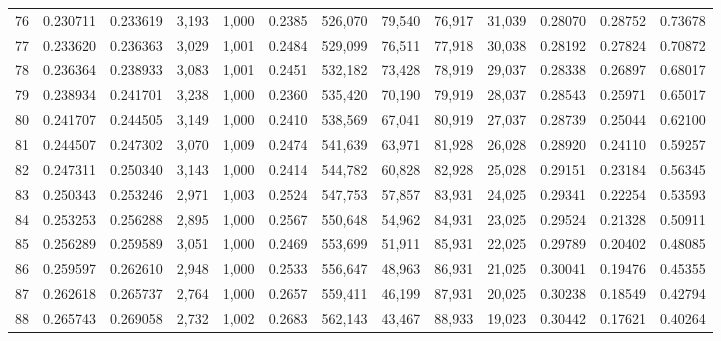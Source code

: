 \begin{tabular}{rrrrrrrrrrrrr}
76  &  0.230711 &  0.233619 &   3,193 &  1,000 &                                     0.2385 &  526,070 &   79,540 &   76,917 &   31,039 &  0.28070 &  0.28752 &  0.73678 \\
77  &  0.233620 &  0.236363 &   3,029 &  1,001 &                                     0.2484 &  529,099 &   76,511 &   77,918 &   30,038 &  0.28192 &  0.27824 &  0.70872 \\
78  &  0.236364 &  0.238933 &   3,083 &  1,001 &                                     0.2451 &  532,182 &   73,428 &   78,919 &   29,037 &  0.28338 &  0.26897 &  0.68017 \\
79  &  0.238934 &  0.241701 &   3,238 &  1,000 &                                     0.2360 &  535,420 &   70,190 &   79,919 &   28,037 &  0.28543 &  0.25971 &  0.65017 \\
80  &  0.241707 &  0.244505 &   3,149 &  1,000 &                                     0.2410 &  538,569 &   67,041 &   80,919 &   27,037 &  0.28739 &  0.25044 &  0.62100 \\
81  &  0.244507 &  0.247302 &   3,070 &  1,009 &                                     0.2474 &  541,639 &   63,971 &   81,928 &   26,028 &  0.28920 &  0.24110 &  0.59257 \\
82  &  0.247311 &  0.250340 &   3,143 &  1,000 &                                     0.2414 &  544,782 &   60,828 &   82,928 &   25,028 &  0.29151 &  0.23184 &  0.56345 \\
83  &  0.250343 &  0.253246 &   2,971 &  1,003 &                                     0.2524 &  547,753 &   57,857 &   83,931 &   24,025 &  0.29341 &  0.22254 &  0.53593 \\
84  &  0.253253 &  0.256288 &   2,895 &  1,000 &                                     0.2567 &  550,648 &   54,962 &   84,931 &   23,025 &  0.29524 &  0.21328 &  0.50911 \\
85  &  0.256289 &  0.259589 &   3,051 &  1,000 &                                     0.2469 &  553,699 &   51,911 &   85,931 &   22,025 &  0.29789 &  0.20402 &  0.48085 \\
86  &  0.259597 &  0.262610 &   2,948 &  1,000 &                                     0.2533 &  556,647 &   48,963 &   86,931 &   21,025 &  0.30041 &  0.19476 &  0.45355 \\
87  &  0.262618 &  0.265737 &   2,764 &  1,000 &                                     0.2657 &  559,411 &   46,199 &   87,931 &   20,025 &  0.30238 &  0.18549 &  0.42794 \\
88  &  0.265743 &  0.269058 &   2,732 &  1,002 &                                     0.2683 &  562,143 &   43,467 &   88,933 &   19,023 &  0.30442 &  0.17621 &  0.40264 \\

\end{tabular}
